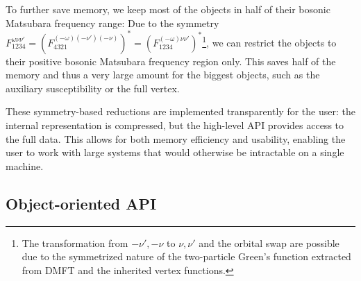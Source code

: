 \documentclass[../../main.tex]{subfiles}
\begin{document}
To further save memory, we keep most of the objects in half of their bosonic Matsubara frequency range: Due to the symmetry $F^{\omega\nu\nu'}_{\mathfrak{1234}}=(F^{(-\omega)(-\nu')(-\nu)}_{\mathfrak{4321}})^{*}=(F^{(-\omega)\nu\nu'}_{\mathfrak{1234}})^{*}$\footnote{The transformation from $-\nu', -\nu$ to $\nu,\nu'$ and the orbital swap are possible due to the symmetrized nature of the two-particle Green's function extracted from DMFT and the inherited vertex functions.}, we can restrict the objects to their positive bosonic Matsubara frequency region only. This saves half of the memory and thus a very large amount for the biggest objects, such as the auxiliary susceptibility or the full vertex.

These symmetry-based reductions are implemented transparently for the user: the internal representation is compressed, but the high-level API provides access to the full data. This allows for both memory efficiency and usability, enabling the user to work with large systems that would otherwise be intractable on a single machine.

\subsection{Object-oriented API}
\end{document}
